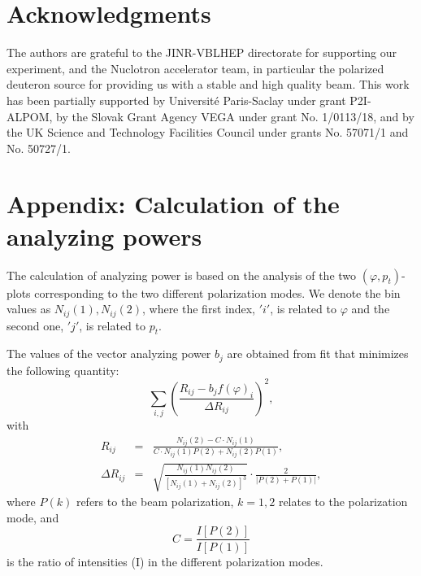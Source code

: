 \documentclass[epj]{svjour}
\begin{document}


\section{Acknowledgments}

The authors are grateful to the JINR-VBLHEP directorate for supporting our experiment, and the Nuclotron accelerator team, in particular the polarized deuteron source  for providing us with a stable and high quality  beam. This work has been partially supported by Universit\'e Paris-Saclay under grant P2I-ALPOM,  by the Slovak Grant Agency VEGA under grant  No. 1/0113/18, and by the  UK Science and Technology Facilities Council  under grants No. 57071/1 and No. 50727/1. 
%
\section{Appendix: Calculation of the analyzing powers}
The calculation of analyzing power is based on the analysis of the two $(\varphi,p_t)$-plots
corresponding to the two different polarization modes. We denote the bin values as $N_{ij}(1),N_{ij}(2)$,
where the first index, $'i'$, is related to $\varphi$ and  the second one, $'j'$, is related to $p_t$.

The values of the vector analyzing power $b_j$ are obtained from fit that minimizes the following quantity:
\begin{equation}\label{anpwv}
    \sum_{i,j} \left(\frac{R_{ij}-b_jf(\varphi)_i}{\Delta R_{ij}}\right)^2,
\end{equation}
with
\begin{eqnarray}
  \label{Rij}
  R_{ij} &=& \frac{N_{ij}(2)-C\cdot N_{ij}(1)}
   {C\cdot N_{ij}(1)P(2)+N_{ij}(2)P(1)},\\
  \Delta R_{ij} &=& \sqrt{\frac{N_{ij}(1)N_{ij}(2)}{[N_{ij}(1)+N_{ij}(2)]^3}}\cdot\frac{2}{|P(2)+P(1)|},
\end{eqnarray}
where
$P(k)$ refers to the beam polarization, $k=1,2$ relates to the polarization mode, and 
$$C=\frac{I[P(2)]}{I[P(1)]}$$
 is the ratio of intensities (I) in the different polarization modes. 
\end{document}
